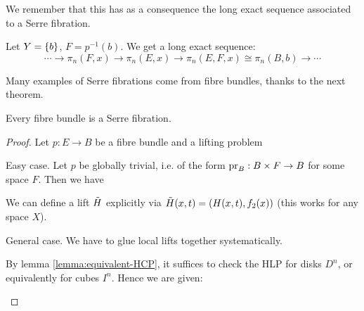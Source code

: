 We remember that this has as a consequence the long exact sequence associated to a Serre fibration.

\begin{theorem}\label{theorem:long-exact-sequence-serre-fibration}
Let $Y=\{b\}$, $F=p^{-1}(b)$. We get a long exact sequence:
\[\cdots\to\pi_n(F,x)\to\pi_n(E,x)\to\pi_n(E,F,x)\cong\pi_n(B,b)\to\cdots\]
\end{theorem}

Many examples of Serre fibrations come from fibre bundles, thanks to the next theorem.

\begin{theorem}
Every fibre bundle is a Serre fibration.
\end{theorem}

\begin{proof}
Let $p:E\to B$ be a fibre bundle and a lifting problem
\begin{center}
\end{center}

Easy case. Let $p$ be globally trivial, i.e. of the form $\operatorname{pr}_B:B\times F\to B$ for some space $F$. Then we have
\begin{center}
\end{center}
We can define a lift $\tilde H$ explicitly via $\tilde H(x,t)=(H(x,t),f_2(x))$ (this works for any space $X$).

General case. We have to glue local lifts together systematically.

By lemma \ref{lemma:equivalent-HCP}, it suffices to check the HLP for disks $D^n$, or equivalently for cubes $I^n$. Hence we are given:
\begin{center}
\end{center}


\end{proof}

